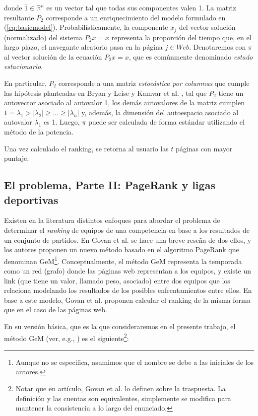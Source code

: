         \noindent donde $\bar{1} \in \mathbb{R}^n$ es un vector tal que todas sus componentes valen 1. La matriz resultante $P_2$ corresponde a un enriquecimiento del modelo formulado en (\ref{eq:basicmodel}). Probabil\'isticamente, la componente $x_j$ del vector soluci\'on (normalizado) del sistema $P_2 x = x$ representa la proporci\'on del tiempo que, en el largo plazo, el navegante aleatorio pasa en la p\'agina $j \in Web$. Denotaremos con $\pi$ al vector soluci\'on de la ecuaci\'on $P_2 x = x$, que es com\'unmente denominado \emph{estado estacionario}.

        En particular, $P_2$ corresponde a una matriz \emph{estoc\'astica por columnas} que cumple las hip\'otesis planteadas en Bryan y Leise \cite{Bryan2006} y Kamvar et al. \cite{Kamvar2003}, tal que $P_2$ tiene un autovector asociado al autovalor 1, los dem\'as autovalores de la matriz cumplen $1 = \lambda_1 > |\lambda_2| \ge \dots \ge |\lambda_n|$ y, adem\'as, la dimensi\'on del autoespacio asociado al autovalor $\lambda_1$ es 1. Luego, $\pi$ puede ser calculada de forma est\'andar utilizando el m\'etodo de la potencia.

        Una vez calculado el ranking, se retorna al usuario las $t$ p\'aginas con mayor puntaje.


    \subsection*{El problema, Parte II: PageRank y ligas deportivas}

        Existen en la literatura distintos enfoques para abordar el problema de determinar el \emph{ranking} de equipos de una competencia en base a los resultados de un conjunto de partidos. En Govan et al. \cite{Govan2008} se hace una breve rese\~na de dos ellos, y los autores proponen un nuevo m\'etodo basado en el algoritmo PageRank que denominan GeM\footnote{Aunque no se especifica, asumimos que el nombre se debe a las iniciales de los autores.}. Conceptualmente, el m\'etodo GeM representa la temporada como un red (grafo) donde las p\'aginas web representan a los equipos, y existe un link (que tiene un valor, llamado peso, asociado) entre dos equipos que los relaciona modelando los resultados de los posibles enfrentamientos entre ellos. En base a este modelo, Govan et al. \cite{Govan2008} proponen calcular el ranking de la misma forma que en el caso de las p\'aginas web.

        En su versi\'on b\'asica, que es la que consideraremos en el presente trabajo, el m\'etodo GeM (ver, e.g., \cite[Secci\'on GeM Ranking Method]{Govan2008}) es el siguiente\footnote{Notar que en art\'iculo, Govan et al. \cite{Govan2008} lo definen sobre la traspuesta. La definici\'on y las cuentas son equivalentes, simplemente se modifica para mantener la consistencia a lo largo del enunciado.}:

